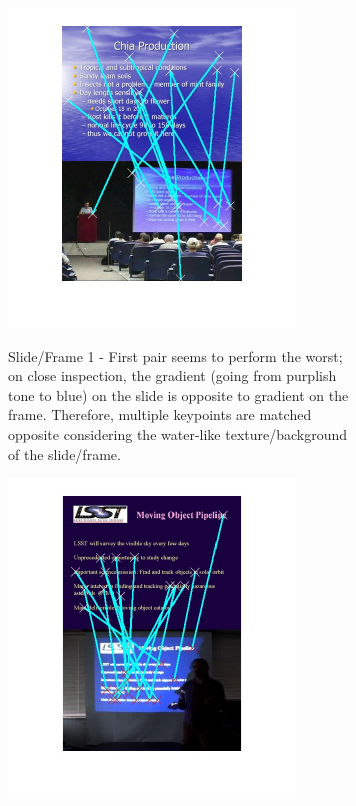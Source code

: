 
\begin{figure}[ht]
	\begin{subfigure}{0.4\textwidth}
	    {\includegraphics[width=3in]{new_figs/fCSF1x.jpg}}
		\caption{Slide/Frame 1 - First pair seems to perform the worst; on close inspection, the gradient (going from purplish tone to blue) on the slide is opposite to gradient on the frame. Therefore, multiple keypoints are matched opposite considering the water-like texture/background of the slide/frame.}
	\end{subfigure}
	\begin{subfigure}{0.4\textwidth}
	    {\includegraphics[width=3in]{new_figs/fCSF2x.jpg}}

\end{subfigure}
\end{figure}
